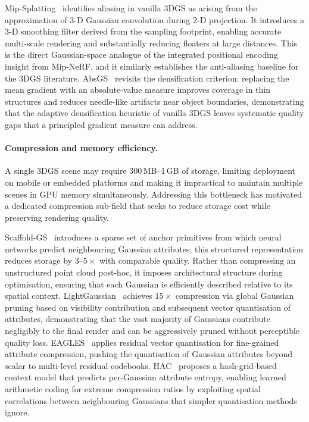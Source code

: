 Mip-Splatting~\citep{yu2024mipsplatting} identifies aliasing in vanilla 3DGS
as arising from the approximation of 3-D Gaussian convolution during 2-D
projection.
It introduces a 3-D smoothing filter derived from the sampling footprint,
enabling accurate multi-scale rendering and substantially reducing floaters
at large distances.
This is the direct Gaussian-space analogue of the integrated positional
encoding insight from Mip-NeRF, and it similarly establishes the anti-aliasing
baseline for the 3DGS literature.
AbsGS~\citep{ye2024absgs} revisits the densification criterion: replacing
the mean gradient with an absolute-value measure improves coverage in
thin structures and reduces needle-like artifacts near object boundaries,
demonstrating that the adaptive densification heuristic of vanilla 3DGS
leaves systematic quality gaps that a principled gradient measure can address.

\paragraph{Compression and memory efficiency.}
A single 3DGS scene may require 300\,MB--1\,GB of storage, limiting deployment
on mobile or embedded platforms and making it impractical to maintain multiple
scenes in GPU memory simultaneously.
Addressing this bottleneck has motivated a dedicated compression sub-field
that seeks to reduce storage cost while preserving rendering quality.

Scaffold-GS~\citep{lu2023scaffoldgs} introduces a sparse set of anchor
primitives from which neural networks predict neighbouring Gaussian attributes;
this structured representation reduces storage by $3$--$5\times$ with
comparable quality.
Rather than compressing an unstructured point cloud post-hoc, it imposes
architectural structure during optimisation, ensuring that each Gaussian
is efficiently described relative to its spatial context.
LightGaussian~\citep{fan2023lightgaussian} achieves $15\times$ compression via
global Gaussian pruning based on visibility contribution and subsequent
vector quantisation of attributes, demonstrating that the vast majority of
Gaussians contribute negligibly to the final render and can be aggressively
pruned without perceptible quality loss.
EAGLES~\citep{girish2024eagles} applies residual vector quantisation
for fine-grained attribute compression, pushing the quantisation
of Gaussian attributes beyond scalar to multi-level residual codebooks.
HAC~\citep{chen2024hac} proposes a hash-grid-based context model that predicts
per-Gaussian attribute entropy, enabling learned arithmetic coding for
extreme compression ratios by exploiting spatial correlations between
neighbouring Gaussians that simpler quantisation methods ignore.

